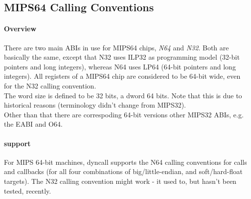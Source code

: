 %
%
%
%

\subsection{MIPS64 Calling Conventions}

\paragraph{Overview}

There are two main ABIs in use for MIPS64 chips, \emph{N64}\cite{MIPSn32/n64}
and \emph{N32}\cite{MIPSn32/n64}. Both are basically the same, except that N32
uses ILP32 as programming model (32-bit pointers and long integers), whereas
N64 uses LP64 (64-bit pointers and long integers). All registers of a MIPS64
chip are considered to be 64-bit wide, even for the N32 calling convention.\\
The word size is defined to be 32 bits, a dword 64 bits. Note that this is due
to historical reasons (terminology didn't change from MIPS32).\\
Other than that there are correspoding 64-bit versions other MIPS32 ABIs, e.g.
the EABI\cite{MIPSeabi} and O64\cite{MIPSo64}.

\paragraph{ support}

For MIPS 64-bit machines, dyncall supports the N64 calling conventions for calls and callbacks (for all four combinations of big/little-endian, and soft/hard-float targets).
The N32 calling convention might work - it used to, but hasn't been tested, recently.

